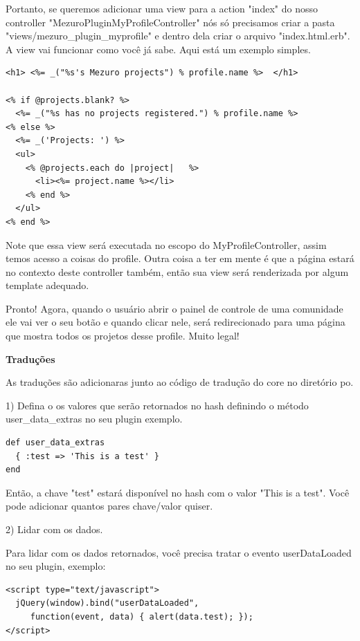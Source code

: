 \documentclass[11pt]{article}
\begin{document}
Portanto, se queremos adicionar uma view para a action "index" do nosso
controller "MezuroPluginMyProfileController" nós só precisamos criar a pasta
"views/mezuro\_plugin\_myprofile" e dentro dela criar o arquivo
"index.html.erb". A view vai funcionar como você já sabe. Aqui está um exemplo
simples.

\begin{Verbatim}[frame=single,fontfamily=courier]
<h1> <%= _("%s's Mezuro projects") % profile.name %>  </h1>
 
<% if @projects.blank? %>
  <%= _("%s has no projects registered.") % profile.name %>
<% else %>
  <%= _('Projects: ') %>
  <ul>
    <% @projects.each do |project|   %>
      <li><%= project.name %></li>
    <% end %>
  </ul>
<% end %>
\end{Verbatim}

Note que essa view será executada no escopo do MyProfileController, assim
temos acesso a coisas do profile. Outra coisa a ter em mente é que a página
estará no contexto deste controller também, então sua view será renderizada
por algum template adequado.

Pronto! Agora, quando o usuário abrir o painel de controle de uma comunidade
ele vai ver o seu botão e quando clicar nele, será redirecionado para uma
página que mostra todos os projetos desse profile. Muito legal!

{\bf Traduções}

As traduções são adicionaras junto ao código de tradução do core no diretório
po.

1) Defina o os valores que serão retornados no hash definindo o método
user\_data\_extras no seu plugin exemplo.

\begin{Verbatim}[frame=single,fontfamily=courier]
def user_data_extras
  { :test => 'This is a test' }
end
\end{Verbatim}

Então, a chave "test" estará disponível no hash com o valor "This is a test".
Você pode adicionar quantos pares chave/valor quiser.

2) Lidar com os dados.

Para lidar com os dados retornados, você precisa tratar o evento userDataLoaded no seu plugin, exemplo:

\begin{Verbatim}[frame=single,fontfamily=courier]
<script type="text/javascript">
  jQuery(window).bind("userDataLoaded",
     function(event, data) { alert(data.test); });
</script>
\end{Verbatim}
\end{document}
